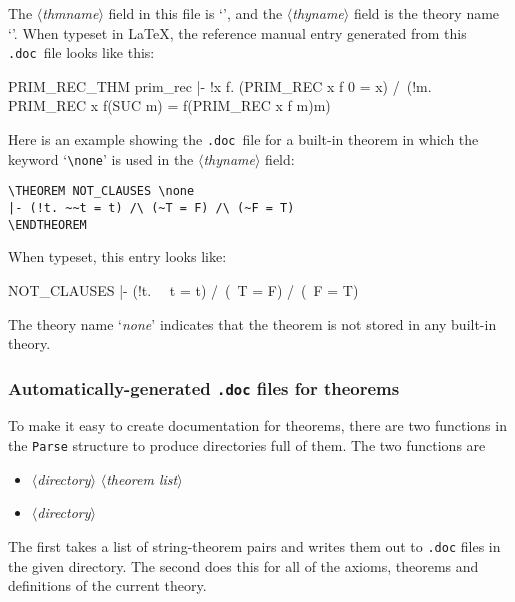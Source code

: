 \documentclass[12pt]{article}
\def\doc{{\tt .doc}}
\def\latex{{\LaTeX}}
\def\sp{\hspace*{3.5mm}}
\def\meta#1{\(\langle\){\it #1}\(\rangle\)}
\begin{document}
\smallskip

\noindent The \meta{thmname} field in this file is  `',
and the \meta{thyname} field is the theory name `'. When
typeset in \latex, the reference manual entry generated from this \doc\ file
looks like this:

{\def\filbreak{\relax}
\THEOREM PRIM\_REC\_THM prim\_rec
|- !x f.
    (PRIM_REC x f 0 = x) /\
    (!m. PRIM_REC x f(SUC m) = f(PRIM_REC x f m)m)
\ENDTHEOREM
}\vspace{4mm plus2mm minus1mm}


Here is an example showing the \doc\ file for a built-in theorem in which  the
keyword `{\small\verb!\none!}' is used in the \meta{thyname} field:

\smallskip

\begin{boxed}\begin{verbatim}
\THEOREM NOT_CLAUSES \none
|- (!t. ~~t = t) /\ (~T = F) /\ (~F = T)
\ENDTHEOREM
\end{verbatim}\end{boxed}

\smallskip

\noindent When typeset, this entry looks like:

{\def\filbreak{\relax}
\THEOREM NOT\_CLAUSES {\none}
|- (!t. ~~t = t) /\ (~T = F) /\ (~F = T)
\ENDTHEOREM
}\vspace{4mm plus2mm minus1mm}

\noindent  The theory name `{\it none}' indicates that the theorem is not
stored in any built-in theory.

\subsubsection{Automatically-generated {\tt .doc} files for theorems}

To make it easy to create documentation for theorems, there are two
functions in the \texttt{Parse} structure to produce directories full
of them.  The two functions are

\begin{itemize}
\item {}\sp\meta{directory}\sp
  \meta{theorem list}

\item {}\sp\meta{directory}
\end{itemize}

\noindent The first takes a list of string-theorem pairs and writes
them out to \texttt{.doc} files in the given directory.  The second
does this for all of the axioms, theorems and definitions of the
current theory.
\end{document}
